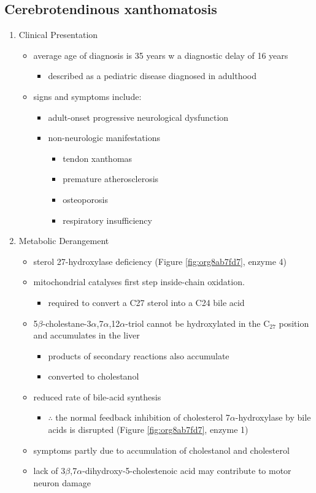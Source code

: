 \documentclass{scrartcl}
\begin{document}
\subsection{Cerebrotendinous xanthomatosis}
\label{sec:org9c76afe}
\begin{enumerate}
\item Clinical Presentation
\label{sec:org8587d10}
\begin{itemize}
\item average age of diagnosis is 35 years w a diagnostic delay of 16 years
\begin{itemize}
\item described as a pediatric disease diagnosed in adulthood
\end{itemize}
\item signs and symptoms include:
\begin{itemize}
\item adult-onset progressive neurological dysfunction
\item non-neurologic manifestations
\begin{itemize}
\item tendon xanthomas
\item premature atherosclerosis
\item osteoporosis
\item respiratory insufficiency
\end{itemize}
\end{itemize}
\end{itemize}

\item Metabolic Derangement
\label{sec:org89689b5}
\begin{itemize}
\item sterol 27-hydroxylase deficiency (Figure \ref{fig:org8ab7fd7}, enzyme 4)
\item mitochondrial catalyses first step inside-chain oxidation.
\begin{itemize}
\item required to convert a C27 sterol into a C24 bile acid
\end{itemize}
\item 5\(\beta\)-cholestane-3\(\alpha\),7\(\alpha\),12\(\alpha\)-triol cannot be hydroxylated in the C\(_{\text{27}}\)
position and accumulates in the liver
\begin{itemize}
\item products of secondary reactions also accumulate
\item converted to cholestanol
\end{itemize}
\item reduced rate of bile-acid synthesis
\begin{itemize}
\item \(\therefore\) the normal feedback inhibition of cholesterol
7\(\alpha\)-hydroxylase by bile acids is disrupted (Figure \ref{fig:org8ab7fd7}, enzyme 1)
\end{itemize}
\item symptoms partly due to accumulation of cholestanol and cholesterol
\item lack of 3\(\beta\),7\(\alpha\)-dihydroxy-5-cholestenoic acid may contribute to motor
neuron damage
\end{itemize}


\end{enumerate}
\end{document}
